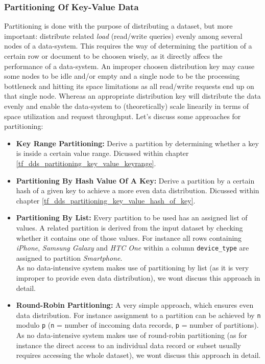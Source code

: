 {\subsubsection{Partitioning Of Key-Value Data}
\label{tf_dds_partitioning_key_value}
Partitioning is done with the purpose of distributing a dataset, but more important: distribute related \textit{load} (read/write queries) evenly among several nodes of a data-system. This requires the way of determining the partition of a certain row or document to be choosen wisely, as it directly affecs the performance of a data-system. An improper choosen distribution key may cause some nodes to be idle and/or empty and a single node to be the processing bottleneck and hitting its space limitations as all read/write requests end up on that single node. Whereas an appropriate distribution key will distribute the data evenly and enable the data-system to (theoretically) scale linearily in terms of space utilization and request throughput. Let's discuss some approaches for partitioning:\\
\begin{itemize}
\item \textbf{Key Range Partitioning:} Derive a partition by determining whether a key is inside a certain value range. Dicussed within chapter \ref{tf_dds_partitioning_key_value_keyrange}.
\item \textbf{Partitioning By Hash Value Of A Key:} Derive a partition by a certain hash of a given key to achieve a more even data distribution. Dicussed within chapter \ref{tf_dds_partitioning_key_value_hash_of_key}.
\item \textbf{Partitioning By List:} Every partition to be used has an assigned list of values. A related partition is derived from the input dataset by checking whether it contains one of those values. For instance all rows containing \textit{iPhone}, \textit{Samsung Galaxy} and \textit{HTC One} within a column \lstinline{device_type} are assigned to partition \textit{Smartphone}. \\
As no data-intensive system makes use of partitioning by list (as it is very improper to provide even data distribution), we wont discuss this approach in detail.
\item \textbf{Round-Robin Partitioning:} A very simple approach, which ensures even data distribution. For instance assignment to a partition can be achieved by \lstinline{n} modulo \lstinline{p} (\lstinline{n} = number of inccoming data records, \lstinline{p} = number of partitions). \\
As no data-intensive system makes use of round-robin partitioning (as for instance the direct access to an individual data record or subset usually requires accessing the whole dataset), we wont discuss this approach in detail.\\
\end{itemize}


}
